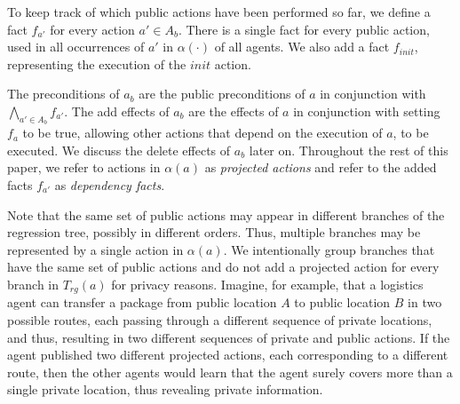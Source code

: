 \documentclass[letterpaper]{article}
\theoremstyle{definition}
\begin{document}
To keep track of which public actions have been performed so far, we define a fact $f_{a'}$ for every action $a'\in A_b$. There is a single fact for every public action, used in all occurrences of $a'$ in $\alpha(\cdot)$ of all agents. We also add a fact $f_{init}$, representing the execution of the $init$ action.

The preconditions of $a_b$ are the public preconditions of $a$
in conjunction with $\bigwedge_{a' \in A_b}f_{a'}$.
The add effects of $a_b$ are the effects of $a$ in conjunction with setting $f_a$ to be true, allowing other actions that depend on the execution of $a$, to be executed. We discuss the delete effects of $a_b$ later on.
Throughout the rest of this paper, we refer to actions in $\alpha(a)$ as {\em projected actions} and refer to the added facts $f_{a'}$ as {\em dependency facts}.




Note that the same set of public actions may appear in different branches of the regression tree, possibly in different orders. Thus, multiple branches may be represented by a single action in $\alpha(a)$.
We intentionally group branches that have the same set of public actions and do not add a projected action for every branch in $T_{rg}(a)$ for privacy reasons. Imagine, for example, that a logistics agent can transfer a package from public location $A$ to public location $B$ in two possible routes, each passing through a different sequence of private locations, and thus, resulting in two different sequences of private and public actions. If the agent published two different projected actions, each corresponding to a different route, then the other agents would learn that the agent surely covers more than a single private location, thus revealing private information.
\end{document}
